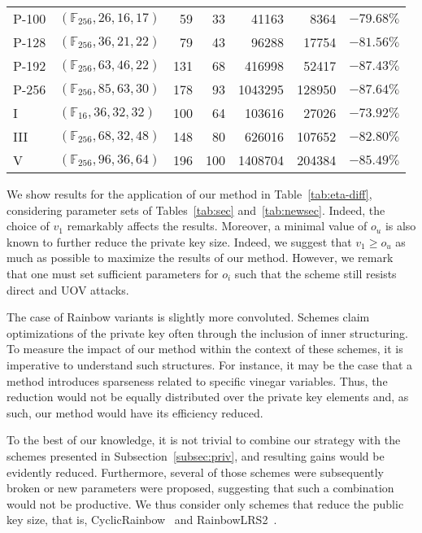 \documentclass[12pt, a4paper, oneside]{memoir}
\theoremstyle{definition}
\begin{document}
\begin{table}[htbp]
\begin{tabular}{*{2}{l}*{5}{r}}
    P-100 & $(\mathbb{F}_{256}, 26, 16, 17)$ &  59 &  33 & \num{   41163} & \num{   8364} & $-79.68\%$ \\
    P-128 & $(\mathbb{F}_{256}, 36, 21, 22)$ &  79 &  43 & \num{   96288} & \num{  17754} & $-81.56\%$ \\
    P-192 & $(\mathbb{F}_{256}, 63, 46, 22)$ & 131 &  68 & \num{  416998} & \num{  52417} & $-87.43\%$ \\
    P-256 & $(\mathbb{F}_{256}, 85, 63, 30)$ & 178 &  93 & \num{ 1043295} & \num{ 128950} & $-87.64\%$ \\
    I     & $(\mathbb{F}_{ 16}, 36, 32, 32)$ & 100 &  64 & \num{  103616} & \num{  27026} & $-73.92\%$ \\
    III   & $(\mathbb{F}_{256}, 68, 32, 48)$ & 148 &  80 & \num{  626016} & \num{ 107652} & $-82.80\%$ \\
    V     & $(\mathbb{F}_{256}, 96, 36, 64)$ & 196 & 100 & \num{ 1408704} & \num{ 204384} & $-85.49\%$ \\
    \bottomrule
  \end{tabular}
\end{table}

We show results for the application of our method in Table~\ref{tab:eta-diff}, considering parameter sets of Tables~\ref{tab:sec} and~\ref{tab:newsec}. Indeed, the choice of $v_{1}$ remarkably affects the results. Moreover, a minimal value of $o_{u}$ is also known to further reduce the private key size. Indeed, we suggest that $v_{1} \geq o_{u}$ as much as possible to maximize the results of our method. However, we remark that one must set sufficient parameters for $o_{i}$ such that the scheme still resists direct and UOV attacks.

The case of Rainbow variants is slightly more convoluted. Schemes claim optimizations of the private key often through the inclusion of inner structuring. To measure the impact of our method within the context of these schemes, it is imperative to understand such structures. For instance, it may be the case that a method introduces sparseness related to specific vinegar variables. Thus, the reduction would not be equally distributed over the private key elements and, as such, our method would have its efficiency reduced.

To the best of our knowledge, it is not trivial to combine our strategy with the schemes presented in Subsection~\ref{subsec:priv}, and resulting gains would be evidently reduced. Furthermore, several of those schemes were subsequently broken or new parameters were proposed, suggesting that such a combination would not be productive. We thus consider only schemes that reduce the public key size, that is, CyclicRainbow~\cite{Petzoldt:201012} and RainbowLRS2~\cite[Section 9.2]{Petzoldt:201307}.
\end{document}
